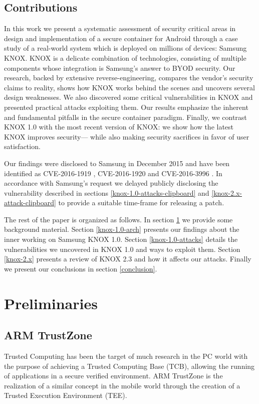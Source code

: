 \documentclass[11pt]{article}
\begin{document}
\subsection{Contributions}
In this work we present a systematic assessment of security critical areas in design and implementation of a secure container for Android 
through a case study of a real-world system which is deployed on millions of devices: 
Samsung KNOX. KNOX is a delicate combination of technologies, consisting of multiple components whose 
integration is Samsung's answer to BYOD security.
Our research, backed by extensive reverse-engineering, compares the vendor's security claims to reality, 
shows how KNOX works behind the scenes and uncovers several design weaknesses.
We also discovered some critical vulnerabilities in KNOX and presented practical attacks exploiting them. 
Our results emphasize the inherent and fundamental pitfalls in the secure container paradigm.
Finally, we contrast KNOX 1.0 with the most recent version of KNOX: we show how the latest KNOX improves security---
while also making security sacrifices in favor of user satisfaction. 

Our findings were disclosed to Samsung in December 2015 \cite{SamsungCorrespondence} and have been identified as CVE-2016-1919 
\cite{CVE-2016-1919}, CVE-2016-1920 \cite{CVE-2016-1920} and CVE-2016-3996 \cite{CVE-2016-3996}. 
In accordance with Samsung's request we delayed publicly disclosing the vulnerability described in sections 
\ref{knox-1.0-attacks-clipboard} and \ref{knox-2.x-attack-clipboard} to provide a suitable time-frame for releasing a patch. 

The rest of the paper is organized as follows. In section \ref{preliminaries} we provide some 
background material. Section \ref{knox-1.0-arch} presents our findings about the inner working on Samsung KNOX 1.0. Section 
\ref{knox-1.0-attacks} details the vulnerabilities we uncovered in KNOX 1.0 and ways to exploit them.
Section \ref{knox-2.x} presents a review of KNOX 2.3 and how it affects our attacks. Finally we present our conclusions in section \ref{conclusion}.

\section{Preliminaries} \label{preliminaries}
\subsection{ARM TrustZone} \label{arm-trustzone}
Trusted Computing has been the target of much research in the PC world \cite{TrustedComputingPlatformsTheNextSecuritySolution, OSLOImprovingTheSecurityOfTrustedComputing}
with the purpose of achieving a Trusted Computing Base (TCB), allowing the running of applications in a secure verified environment.
ARM TrustZone \cite{TrustZoneSecurityWhitepaper} is the realization of a similar concept in the mobile world through the creation of a 
Trusted Execution Environment (TEE).
\end{document}
